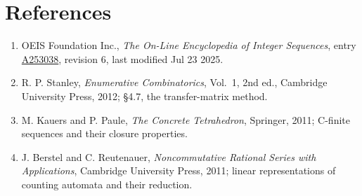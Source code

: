 \documentclass[11pt]{article}
\theoremstyle{definition}
\begin{document}
\section{References}

\begin{enumerate}

\item OEIS Foundation Inc., \emph{The On-Line Encyclopedia of Integer Sequences}, entry \href{https://oeis.org/A253038}{A253038}, revision 6, last modified Jul 23 2025.

\item R. P. Stanley, \emph{Enumerative Combinatorics}, Vol.~1, 2nd ed., Cambridge University Press, 2012; \S4.7, the transfer-matrix method.

\item M. Kauers and P. Paule, \emph{The Concrete Tetrahedron}, Springer, 2011; C-finite sequences and their closure properties.

\item J. Berstel and C. Reutenauer, \emph{Noncommutative Rational Series with Applications}, Cambridge University Press, 2011; linear representations of counting automata and their reduction.

\end{enumerate}
\end{document}
